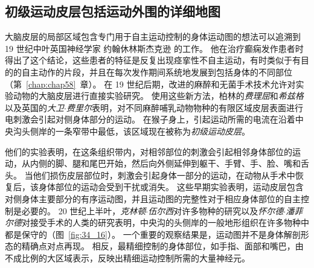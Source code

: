 \subsection{初级运动皮层包括运动外围的详细地图}

大脑皮层的局部区域包含专门用于自主运动控制的身体运动图的想法可以追溯到 19 世纪中叶英国神经学家 约翰休林斯杰克逊 的工作。
他在治疗癫痫发作患者时得出了这个结论，这些患者的特征是反复出现痉挛性不自主运动，有时类似于有目的的自主动作的片段，并且在每次发作期间系统地发展到包括身体的不同部位（第~\ref{chap:chap58}~章）。
在 19 世纪后期，改进的麻醉和无菌手术技术允许对实验动物的大脑皮层进行直接实验研究。
使用这些新方法，柏林的\textit{费理屈}和\textit{希兹格}以及英国的\textit{大卫$\cdot$费里尔}表明，对不同麻醉哺乳动物物种的有限区域皮层表面进行电刺激会引起对侧身体部分的运动。
在猴子身上，引起运动所需的电流在沿着中央沟头侧岸的一条窄带中最低，该区域现在被称为\textit{初级运动皮层}。


他们的实验表明，在这条组织带内，对相邻部位的刺激会引起相邻身体部位的运动，从内侧的脚、腿和尾巴开始，然后向外侧延伸到躯干、手臂、手、脸、嘴和舌头。
当他们损伤皮层部位时，刺激会引起身体一部分的运动，在动物从手术中恢复后，该身体部位的运动会受到干扰或消失。
这些早期实验表明，运动皮层包含对侧身体主要部分的有序运动图，并且运动图的完整性对于相应身体部位的自主控制是必要的。
20 世纪上半叶，\textit{克林顿$\cdot$伍尔西}对许多物种的研究以及\textit{怀尔德$\cdot$潘菲尔德}对接受手术的人类的研究表明，中央沟的头侧岸的一般地形组织在许多物种中都是保守的（图~\ref{fig:34_16}）。
一个重要的观察结果是，运动图并不是身体解剖形态的精确点对点再现。
相反，最精细控制的身体部位，如手指、面部和嘴巴，由不成比例的大区域表示，反映出精细运动控制所需的大量神经元。


